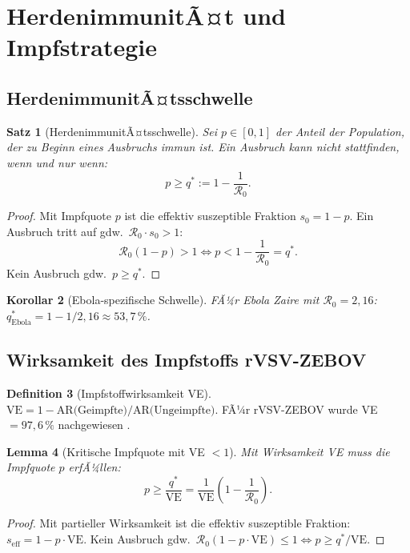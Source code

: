 ﻿\documentclass[12pt,a4paper]{article}
\theoremstyle{definition}
\newtheorem{definition}{Definition}[section]
\theoremstyle{plain}
\newtheorem{satz}[definition]{Satz}
\newtheorem{lemma}[definition]{Lemma}
\newtheorem{korollar}[definition]{Korollar}
\theoremstyle{remark}
\begin{document}
\section{HerdenimmunitÃ¤t und Impfstrategie}

\subsection{HerdenimmunitÃ¤tsschwelle}

\begin{satz}[HerdenimmunitÃ¤tsschwelle]
\label{satz:herd}
Sei $p \in [0,1]$ der Anteil der Population, der zu Beginn eines Ausbruchs immun ist.
Ein Ausbruch kann nicht stattfinden, wenn und nur wenn:
\[
  p \geq q^* := 1 - \frac{1}{\mathcal{R}_0}.
\]
\end{satz}

\begin{proof}
Mit Impfquote $p$ ist die effektiv suszeptible Fraktion $s_0 = 1 - p$.
Ein Ausbruch tritt auf gdw.\ $\mathcal{R}_0 \cdot s_0 > 1$:
\[
  \mathcal{R}_0(1-p) > 1 \Leftrightarrow p < 1 - \frac{1}{\mathcal{R}_0} = q^*.
\]
Kein Ausbruch gdw.\ $p \geq q^*$.
\end{proof}

\begin{korollar}[Ebola-spezifische Schwelle]
FÃ¼r Ebola Zaire mit $\mathcal{R}_0 = 2{,}16$:
$q^*_{\text{Ebola}} = 1 - 1/2{,}16 \approx 53{,}7\,\%$.
\end{korollar}

\subsection{Wirksamkeit des Impfstoffs rVSV-ZEBOV}

\begin{definition}[Impfstoffwirksamkeit VE]
$\text{VE} = 1 - \text{AR(Geimpfte)}/\text{AR(Ungeimpfte)}$.
FÃ¼r rVSV-ZEBOV wurde VE $= 97{,}6\,\%$ nachgewiesen \cite{henao2017}.
\end{definition}

\begin{lemma}[Kritische Impfquote mit VE $< 1$]
Mit Wirksamkeit VE muss die Impfquote $p$ erfÃ¼llen:
\[
  p \geq \frac{q^*}{\text{VE}} = \frac{1}{\text{VE}}\!\left(1 - \frac{1}{\mathcal{R}_0}\right).
\]
\end{lemma}

\begin{proof}
Mit partieller Wirksamkeit ist die effektiv suszeptible Fraktion:
$s_{\text{eff}} = 1 - p \cdot \text{VE}$.
Kein Ausbruch gdw.\ $\mathcal{R}_0(1 - p \cdot \text{VE}) \leq 1
\Leftrightarrow p \geq q^*/\text{VE}$.
\end{proof}
\end{document}
